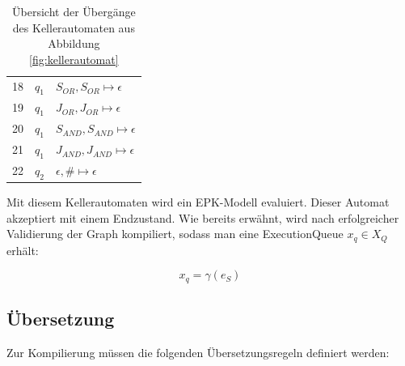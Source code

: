 \begin{table}[H]
\begin{tabularx}{\textwidth}{l >{\raggedright\arraybackslash}X >{\raggedright\arraybackslash}X}
18 & $q_1$ & $ S_{OR}, S_{OR} \mapsto \epsilon $\\
19 & $q_1$ & $ J_{OR}, J_{OR} \mapsto \epsilon $\\
20 & $q_1$ & $ S_{AND}, S_{AND} \mapsto \epsilon $\\
21 & $q_1$ & $ J_{AND}, J_{AND} \mapsto \epsilon $\\
22 & $q_2$ & $ \epsilon, \# \mapsto \epsilon $ \\
\bottomrule
\end{tabularx}
\normalsize
\renewcommand{\arraystretch}{1}
\caption{Übersicht der Übergänge des Kellerautomaten aus Abbildung \ref{fig:kellerautomat}}
\label{tab:kellerautomat-uebergaenge}
\end{table}

\noindent Mit diesem Kellerautomaten wird ein EPK-Modell evaluiert. Dieser Automat akzeptiert mit einem Endzustand. Wie bereits erwähnt, 
wird nach erfolgreicher Validierung der Graph kompiliert, sodass man eine ExecutionQueue $x_q \in X_Q$ erhält:

$$x_q = \gamma(e_S)$$


\subsection{Übersetzung}
\label{translation-function}
Zur Kompilierung müssen die folgenden Übersetzungsregeln definiert werden:

